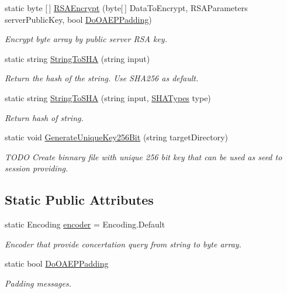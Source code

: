 \begin{DoxyCompactItemize}
static byte \mbox{[}$\,$\mbox{]} \mbox{\hyperlink{class_pipes_provider_1_1_security_1_1_crypto_a09f2c39c0c97bf871f3ab9df2f1a40fd}{R\+S\+A\+Encrypt}} (byte\mbox{[}$\,$\mbox{]} Data\+To\+Encrypt, R\+S\+A\+Parameters server\+Public\+Key, bool \mbox{\hyperlink{class_pipes_provider_1_1_security_1_1_crypto_a47ca964d3fea31884d730936a9be1c81}{Do\+O\+A\+E\+P\+Padding}})
\begin{DoxyCompactList}\small\item\em Encrypt byte array by public server R\+SA key. \end{DoxyCompactList}\item 
static string \mbox{\hyperlink{class_pipes_provider_1_1_security_1_1_crypto_aa02bcc81446a930930bb43ff46981f60}{String\+To\+S\+HA}} (string input)
\begin{DoxyCompactList}\small\item\em Return the hash of the string. Use S\+H\+A256 as default. \end{DoxyCompactList}\item 
static string \mbox{\hyperlink{class_pipes_provider_1_1_security_1_1_crypto_af652a2847acd1502625c5496c4887274}{String\+To\+S\+HA}} (string input, \mbox{\hyperlink{class_pipes_provider_1_1_security_1_1_crypto_a6956e9aac98864917946b750dee3596e}{S\+H\+A\+Types}} type)
\begin{DoxyCompactList}\small\item\em Return hash of string. \end{DoxyCompactList}\item 
static void \mbox{\hyperlink{class_pipes_provider_1_1_security_1_1_crypto_a58ed72a691ed535fb8490374a393c0f1}{Generate\+Unique\+Key256\+Bit}} (string target\+Directory)
\begin{DoxyCompactList}\small\item\em T\+O\+DO Create binnary file with unique 256 bit key that can be used as seed to session providing. \end{DoxyCompactList}\end{DoxyCompactItemize}
\subsection*{Static Public Attributes}
\begin{DoxyCompactItemize}
\item 
static Encoding \mbox{\hyperlink{class_pipes_provider_1_1_security_1_1_crypto_a891868b922c2ce6a0f85a01c6bf684e5}{encoder}} = Encoding.\+Default
\begin{DoxyCompactList}\small\item\em Encoder that provide concertation query from string to byte array. \end{DoxyCompactList}\item 
static bool \mbox{\hyperlink{class_pipes_provider_1_1_security_1_1_crypto_a47ca964d3fea31884d730936a9be1c81}{Do\+O\+A\+E\+P\+Padding}}
\begin{DoxyCompactList}\small\item\em Padding messages. \end{DoxyCompactList}\end{DoxyCompactItemize}
